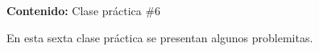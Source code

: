 {\Large
    \textbf{Contenido:} Clase práctica \#6
}

En esta sexta clase práctica se presentan algunos problemitas.